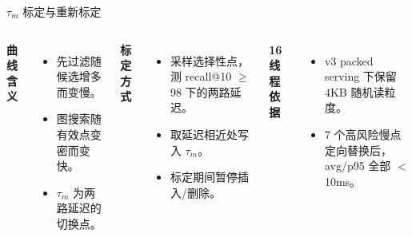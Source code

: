 \documentclass[aspectratio=169]{xmu-slide}
\begin{document}
\begin{frame}[c]{$\tau_m$ 标定与重新标定}
\begin{columns}[T,onlytextwidth]
        \begin{minipage}{0.98\linewidth}
            \scriptsize
            \raggedright
            \textbf{曲线含义}
            \vspace{0.06em}
            \begin{itemize}
                \setlength{\itemsep}{0.08em}
                \item 先过滤随候选增多而变慢。
                \item 图搜索随有效点变密而变快。
                \item $\tau_m$ 为两路延迟的切换点。
            \end{itemize}
            \vspace{0.06em}
            \textbf{标定方式}
            \vspace{0.06em}
            \begin{itemize}
                \setlength{\itemsep}{0.08em}
                \item 采样选择性点，测 recall@10 $\geq$ 98 下的两路延迟。
                \item 取延迟相近处写入 $\tau_m$。
                \item 标定期间暂停插入/删除。
            \end{itemize}
            \vspace{0.06em}
            \textbf{16 线程依据}
            \vspace{0.06em}
            \begin{itemize}
                \setlength{\itemsep}{0.08em}
                \item v3 packed serving 下保留 4KB 随机读粒度。
                \item 7 个高风险慢点定向替换后，avg/p95 全部 $<$10ms。
            \end{itemize}
        \end{minipage}
    \end{columns}
\end{frame}
\end{document}
